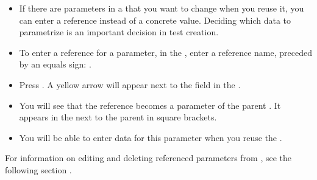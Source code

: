 \begin{itemize}
\item If there are parameters in a \gdcase{} that you want to change when you reuse it, you can enter a reference instead of a concrete value. Deciding which data to parametrize is an important decision in test creation.
\item To enter a reference for a parameter, in the \gdpropview{}, enter a reference name, preceded by an equals sign: . 

\item Press . 
A yellow arrow will appear next to the  field in the \gdpropview{}.
\item You will see that the reference becomes a parameter of the parent \gdcase{}. It appears in the \gdtestcasebrowser{} next to the parent \gdcase{} in square brackets. 
\item You will be able to enter data for this parameter when you reuse the \gdcase{}. 
\end{itemize}

For information on editing and deleting referenced parameters from \gdcases{}, see the following section . 



